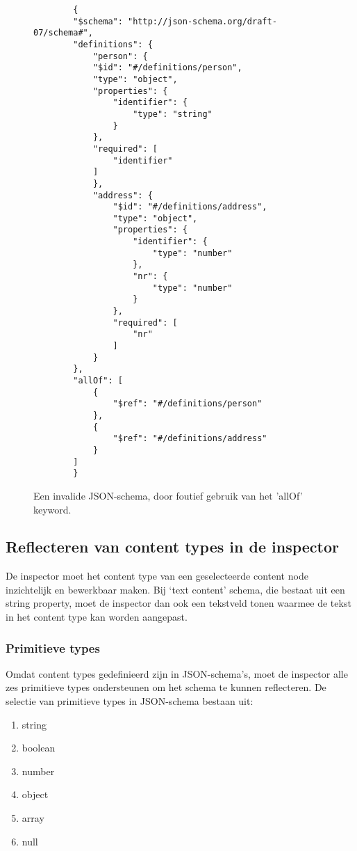 \begin{figure}[H]
    \centering
    \lstset{language=JSON}
    \begin{lstlisting}
        {
        "$schema": "http://json-schema.org/draft-07/schema#",
        "definitions": {
            "person": {
            "$id": "#/definitions/person",
            "type": "object",
            "properties": {
                "identifier": {
                    "type": "string"
                }
            },
            "required": [
                "identifier"
            ]
            },
            "address": {
                "$id": "#/definitions/address",
                "type": "object",
                "properties": {
                    "identifier": {
                        "type": "number"
                    },
                    "nr": {
                        "type": "number"
                    }
                },
                "required": [
                    "nr"
                ]
            }
        },
        "allOf": [
            {
                "$ref": "#/definitions/person"
            },
            {
                "$ref": "#/definitions/address"
            }
        ]
        }     
    \end{lstlisting}
    \caption{Een invalide JSON-schema, door foutief gebruik van het 'allOf' keyword.}
    \label{fig:allofinvalidjsonschema}
\end{figure}

\pagebreak
\subsection{Reflecteren van content types in de inspector}
De inspector moet het content type van een geselecteerde content node inzichtelijk en bewerkbaar maken. Bij ‘text content’ schema, die bestaat uit een string property, moet de inspector dan ook een tekstveld tonen waarmee de tekst in het content type kan worden aangepast.
\subsubsection{Primitieve types}
Omdat content types gedefinieerd zijn in JSON-schema’s, moet de inspector alle zes primitieve types\cite{Droettboom2016} ondersteunen om het schema te kunnen reflecteren. De selectie van primitieve types in JSON-schema bestaan uit:

\begin{enumerate}
    \item string
    \item boolean
    \item number
    \item object
    \item array
    \item null
\end{enumerate}

